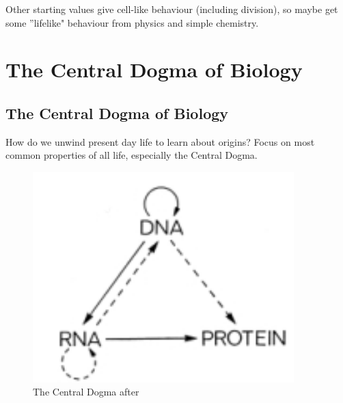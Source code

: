 \documentclass[]{article}
\begin{document}
Other starting values give cell-like behaviour (including division), so maybe get some ''lifelike" behaviour from physics and simple chemistry.

\section{The Central Dogma of Biology}


\subsection{The Central Dogma of Biology}

How do we unwind present day life to learn about origins? Focus on most common properties of all life, especially the Central Dogma.\cite{crick1958biological} \cite{crick1970central}

\begin{figure}[H]
	\caption{The Central Dogma after \cite{crick1970central}}\label{fig:CentralDogma} 
	\includegraphics[width=0.9\textwidth]{CentralDogma}
\end{figure}
\end{document}
